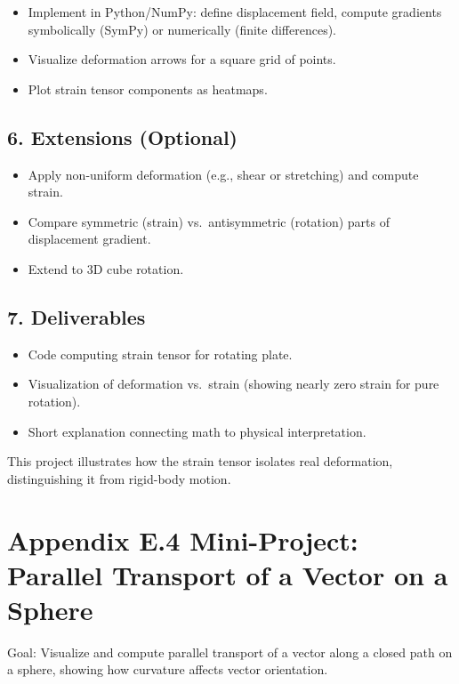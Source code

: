 \documentclass[
  letterpaper,
  DIV=11,
  numbers=noendperiod]{scrreprt}
\providecommand{\tightlist}{%
  \setlength{\itemsep}{0pt}\setlength{\parskip}{0pt}}
\begin{document}
\begin{itemize}
\tightlist
\item
  Implement in Python/NumPy: define displacement field, compute
  gradients symbolically (SymPy) or numerically (finite differences).
\item
  Visualize deformation arrows for a square grid of points.
\item
  Plot strain tensor components as heatmaps.
\end{itemize}

\subsection{6. Extensions (Optional)}\label{extensions-optional-2}

\begin{itemize}
\tightlist
\item
  Apply non-uniform deformation (e.g., shear or stretching) and compute
  strain.
\item
  Compare symmetric (strain) vs.~antisymmetric (rotation) parts of
  displacement gradient.
\item
  Extend to 3D cube rotation.
\end{itemize}

\subsection{7. Deliverables}\label{deliverables-2}

\begin{itemize}
\tightlist
\item
  Code computing strain tensor for rotating plate.
\item
  Visualization of deformation vs.~strain (showing nearly zero strain
  for pure rotation).
\item
  Short explanation connecting math to physical interpretation.
\end{itemize}

This project illustrates how the strain tensor isolates real
deformation, distinguishing it from rigid-body motion.

\section{Appendix E.4 Mini-Project: Parallel Transport of a Vector on a
Sphere}\label{appendix-e.4-mini-project-parallel-transport-of-a-vector-on-a-sphere}

Goal: Visualize and compute parallel transport of a vector along a
closed path on a sphere, showing how curvature affects vector
orientation.
\end{document}

